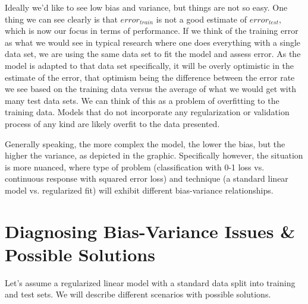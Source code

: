 \documentclass[english,nohyper,titlepage]{tufte-handout}\usepackage{knitr}
\begin{document}
Ideally we'd like to see low bias and variance, but things are not so easy. One thing we can see clearly is that $error_{train}$ is not a good estimate of $error_{test}$, which is now our focus in terms of performance. If we think of the training error as what we would see in typical research where one does everything with a single data set, we are using the same data set to fit the model and assess error.  As the model is adapted to that data set specifically, it will be overly optimistic in the estimate of the error, that optimism being the difference between the error rate we see based on the training data versus the average of what we would get with many test data sets.  We can think of this as a problem of overfitting to the training data.  Models that do not incorporate any regularization or validation process of any kind are likely overfit to the data presented.

Generally speaking, the more complex the model, the lower the bias, but the higher the variance, as depicted in the graphic.  Specifically however, the situation is more nuanced, where type of problem (classification with 0-1 loss vs. continuous response with squared error loss) and technique (a standard linear model vs. regularized fit) will exhibit different bias-variance relationships.

\section{Diagnosing Bias-Variance Issues \& Possible Solutions}
Let's assume a regularized linear model with a standard data split into training and test sets.  We will describe different scenarios with possible solutions.

\end{document}
